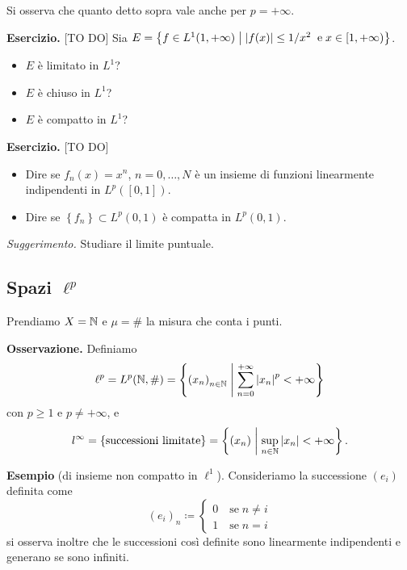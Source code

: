 \documentclass[a4paper, 12pt]{report}
\begin{document}
Si osserva che quanto detto sopra vale anche per $p = + \infty$.

\textbf{Esercizio.} [TO DO] Sia $E = \left\{ f \in L^1(1,+\infty) \;\middle|\; \left| f(x) \right| \leq 1 / x^2 \;\; \text{e} \;x \in [1,+\infty) \right\}$.

\begin{itemize}

\item $E$ è limitato in $L^1$?

\item $E$ è chiuso in $L^1$?

\item $E$ è compatto in $L^1$?

\end{itemize}

\textbf{Esercizio.} [TO DO] 
\begin{itemize}
\item Dire se $f_n(x) = x^n$, $n = 0,\ldots , N$ è un insieme di funzioni linearmente indipendenti in $L^p([0,1])$.

\item Dire se $\left\{ f_n \right\} \subset L^p(0,1)$ è compatta in $L^p(0,1)$.
\end{itemize}
\textit{Suggerimento.} Studiare il limite puntuale.

\subsection{Spazi $\ell^p$}

Prendiamo $X = \mathbb N$ e $\mu = \#$ la misura che conta i punti.

\textbf{Osservazione.} Definiamo
%
$$
\ell^p = L^p(\mathbb N, \#) = \left\{ \left( x_n \right)_{n \in \mathbb N} \;\middle|\; \sum_{n=0}^{+\infty} \left| x_n \right|^p < +\infty  \right\}
$$
con $p \geq 1$ e $p \neq +\infty$, e
%
$$
l^{\infty} = \left\{ \text{successioni limitate} \right\} = \left\{ \left( x_n \right) \;\middle|\; \sup_{n \in \mathbb N}\left| x_n \right| < +\infty \right\}.
$$
%

\textbf{Esempio} (di insieme non compatto in $\ell^1$). Consideriamo la successione $\left( e_i \right)$ definita come
%
$$
(e_i)_n \coloneqq 
\begin{cases}
0 \quad \text{se} \; n \neq i \\
1 \quad \text{se} \; n = i
\end{cases} 
$$
%
si osserva inoltre che le successioni così definite sono linearmente indipendenti e generano se sono infiniti.
\end{document}
